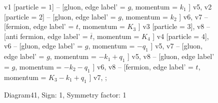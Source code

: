 \documentclass{revtex4}
\begin{document}
\begin{figure}[!htb]
\begin{center}
{    %
v1 [particle = \(1\)] -- [gluon, edge label' = \(g\), momentum = \(k_{1}\) ] v5, 
v2 [particle = \(2\)] -- [gluon, edge label' = \(g\), momentum = \(k_{2}\) ] v6, 
v7 -- [fermion, edge label' = \(t\), momentum = \(K_{3}\) ] v3 [particle = \(3\)], 
v8 -- [anti fermion, edge label' = \(\overline{t}\), momentum = \(K_{4}\) ] v4 [particle = \(4\)], 
v6 -- [gluon, edge label' = \(g\), momentum = \(-q_{1}\) ] v5, 
v7 -- [gluon, edge label' = \(g\), momentum = \(-k_{1} + q_{1}\) ] v5, 
v8 -- [gluon, edge label' = \(g\), momentum = \(-k_{2} - q_{1}\) ] v6, 
v8 -- [fermion, edge label' = \(t\), momentum = \(K_{3} - k_{1} + q_{1}\) ] v7, 
};
\end{center}
\caption{Diagram41, Sign: 1, Symmetry factor: 1}
\end{figure}
\newpage
\end{document}
